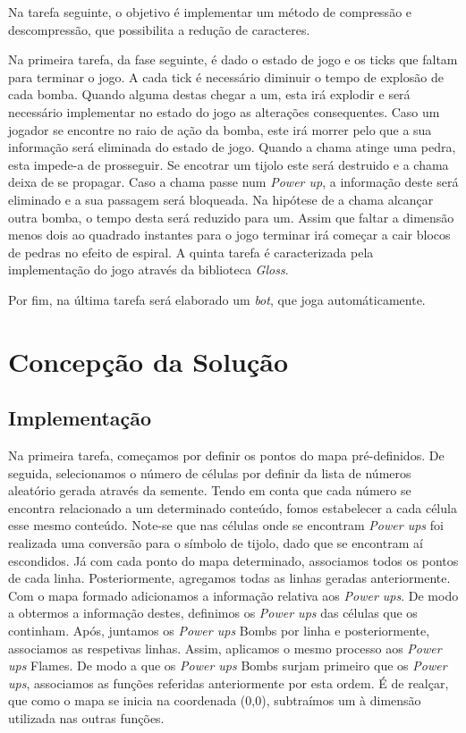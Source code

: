\documentclass[a4paper]{article}
\begin{document}
Na tarefa seguinte, o objetivo é implementar um método de compressão e descompressão, que possibilita a redução de caracteres.

Na primeira tarefa, da fase seguinte, é dado o estado de jogo e os ticks que faltam para terminar o jogo. A cada tick é necessário diminuir o tempo de explosão de cada bomba. Quando alguma destas chegar a um, esta irá explodir e será necessário implementar no estado do jogo as alterações consequentes. Caso um jogador se encontre no raio de ação da bomba, este irá morrer pelo que a sua informação será eliminada do estado de jogo. Quando a chama atinge uma pedra, esta impede-a de prosseguir. Se encotrar um tijolo este será destruido e a chama deixa de se propagar. Caso a chama passe num \textit{Power up}, a informação deste será eliminado e a sua passagem será bloqueada. Na hipótese de a chama alcançar outra bomba, o tempo desta será reduzido para um. Assim que faltar a dimensão menos dois ao quadrado instantes para o jogo terminar irá começar a cair blocos de pedras no efeito de espiral.
A quinta tarefa é caracterizada pela implementação do jogo através da biblioteca \textit{Gloss}.

Por fim, na última tarefa será elaborado um \textit{bot}, que joga automáticamente.   

\section{Concepção da Solução}
\label{sec:solucao}

\subsection{Implementação}
Na primeira tarefa, começamos por definir os pontos do mapa pré-definidos. De seguida, selecionamos o número de células por definir da lista de números aleatório gerada através da semente. Tendo em conta que cada número se encontra relacionado a um determinado conteúdo, fomos estabelecer a cada célula esse mesmo conteúdo. Note-se que nas células onde se encontram \textit{Power ups} foi realizada uma conversão para o símbolo de tijolo, dado que se encontram aí escondidos. Já com cada ponto do mapa determinado, associamos todos os pontos de cada linha. Posteriormente, agregamos todas as linhas geradas anteriormente. Com o mapa formado adicionamos a informação relativa aos \textit{Power ups}. De modo a obtermos a informação destes, definimos os \textit{Power ups} das células que os continham. Após, juntamos os \textit{Power ups} Bombs por linha e posteriormente, associamos as respetivas linhas. Assim, aplicamos o mesmo processo aos \textit{Power ups} Flames. De modo a que os \textit{Power ups} Bombs surjam primeiro que os \textit{Power ups}, associamos as funções referidas anteriormente por esta ordem. É de realçar, que como o mapa se inicia na coordenada (0,0), subtraímos um à dimensão utilizada nas outras funções.
\end{document}
